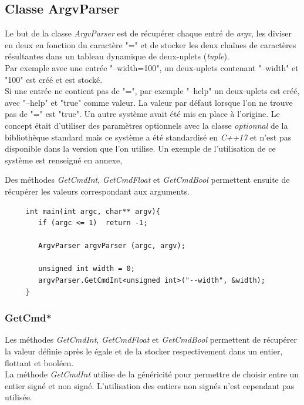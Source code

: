   \subsection{Classe ArgvParser}
  
  Le but de la classe \textit{ArgvParser} est de récupérer chaque entré de \textit{argv}, les diviser en deux en fonction du caractère "=" et de stocker les deux chaînes de caractères résultantes dans un tableau dynamique de deux-uplets (\textit{tuple}).\\
  
  Par exemple avec une entrée "--width=100", un deux-uplets contenant "--width" et "100" est créé et est stocké.\\
  Si une entrée ne contient pas de "=", par exemple "--help" un deux-uplets est créé, avec "--help" et "true" comme valeur. La valeur par défaut lorsque l'on ne trouve pas de "=" est "true".
  Un autre système avait été mis en place à l'origine. Le concept était d'utiliser des paramètres optionnels
  avec la classe \textit{optionnal} de la bibliothèque standard mais ce système a été standardisé en \textit{C++17} et n'est pas disponible dans la version que l'on utilise. Un exemple de l'utilisation de ce système est renseigné en annexe, 
  
  Des méthodes \textit{GetCmdInt}, \textit{GetCmdFloat} et \textit{GetCmdBool} permettent ensuite de récupérer les valeurs correspondant aux arguments.
  
  \lstset{language=C++}
  \begin{lstlisting}
     int main(int argc, char** argv){
        if (argc <= 1)  return -1;
        
        ArgvParser argvParser (argc, argv);
        
        unsigned int width = 0;
        argvParser.GetCmdInt<unsigned int>("--width", &width);
     }
  \end{lstlisting}
  
   \subsubsection{GetCmd*}
    Les méthodes \textit{GetCmdInt}, \textit{GetCmdFloat} et \textit{GetCmdBool} permettent de récupérer la valeur définie après le égale et de la stocker respectivement dans un entier, flottant et booléen.\\
    
    La méthode \textit{GetCmdInt} utilise de la généricité pour permettre de choisir entre un entier signé et non signé. L'utilisation des entiers non signés n'est cependant pas utilisée.\\
    
